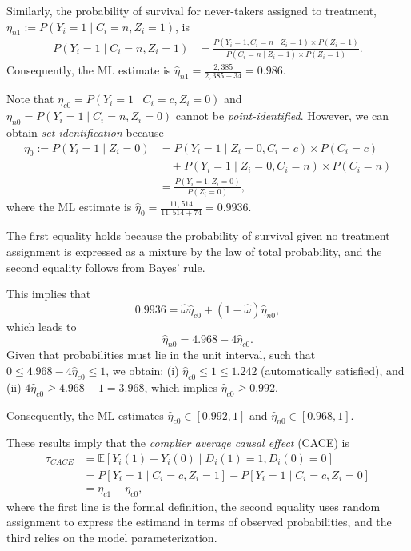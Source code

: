 Similarly, the probability of survival for never-takers assigned to treatment, $\eta_{n1} := P(Y_i = 1 \mid C_i = n, Z_i = 1)$, is
\begin{align*}
	P(Y_i = 1 \mid C_i = n, Z_i = 1) 
	&= \frac{P(Y_i = 1, C_i = n \mid Z_i = 1) \times P(Z_i = 1)}{P(C_i = n \mid Z_i = 1) \times P(Z_i = 1)}.
\end{align*}
Consequently, the ML estimate is $\hat{\eta}_{n1} = \frac{2{,}385}{2{,}385 + 34} = 0.986.$

Note that $\eta_{c0} = P(Y_i = 1 \mid C_i = c, Z_i = 0)$ and $\eta_{n0} = P(Y_i = 1 \mid C_i = n, Z_i = 0)$ cannot be \textit{point-identified}. However, we can obtain \emph{set identification} because
\begin{align*}
	\eta_0:=P(Y_i = 1 \mid Z_i = 0) 
	&= P(Y_i = 1 \mid Z_i = 0, C_i = c) \times P(C_i = c) \\
	&\quad + P(Y_i = 1 \mid Z_i = 0, C_i = n) \times P(C_i = n) \\
	&= \frac{P(Y_i = 1, Z_i = 0)}{P(Z_i = 0)},
\end{align*} where the ML estimate is $\hat{\eta}_0= \frac{11{,}514}{11{,}514 + 74}= 0.9936.$

The first equality holds because the probability of survival given no treatment assignment is expressed as a mixture by the law of total probability, and the second equality follows from Bayes' rule.

This implies that 
\[
0.9936 = \hat{\omega} \hat{\eta}_{c0} + (1-\hat{\omega})\hat{\eta}_{n0},
\]
which leads to 
\[
\hat{\eta}_{n0} = 4.968 - 4\hat{\eta}_{c0}.
\]
Given that probabilities must lie in the unit interval, such that $0 \leq 4.968 - 4\hat{\eta}_{c0} \leq 1$, we obtain:  
(i) $\hat{\eta}_{c0} \leq 1 \leq 1.242$ (automatically satisfied), and  
(ii) $4\hat{\eta}_{c0} \geq 4.968 - 1 = 3.968$, which implies $\hat{\eta}_{c0} \geq 0.992$.  

Consequently, the ML estimates $\hat{\eta}_{c0} \in [0.992, 1]$ and $\hat{\eta}_{n0} \in [0.968, 1]$.

These results imply that the \textit{complier average causal effect} (CACE) is
\begin{align*}
	\tau_{CACE} &= \mathbb{E}[Y_i(1)-Y_i(0)\mid D_i(1)=1,D_i(0)=0] \\
	&= P[Y_i = 1 \mid C_i = c, Z_i = 1] - P[Y_i = 1 \mid C_i = c, Z_i = 0] \\
	&= \eta_{c1} - \eta_{c0},
\end{align*}
where the first line is the formal definition, the second equality uses random assignment to express the estimand in terms of observed probabilities, and the third relies on the model parameterization.


